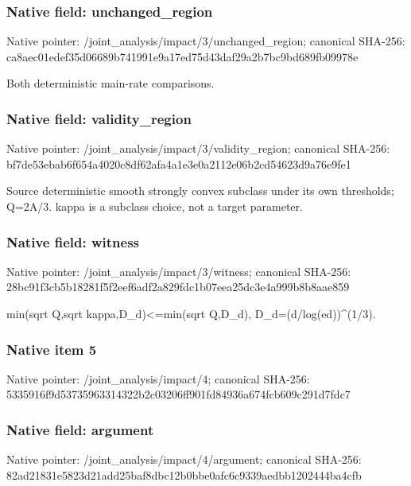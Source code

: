 \documentclass[10pt,a4paper]{article}
\begin{document}
\subsubsection{Native field: unchanged\_\allowbreak{}region}
Native pointer: /joint\_\allowbreak{}analysis/impact/3/unchanged\_\allowbreak{}region; canonical SHA-256: ca8aec01edef35d06689b741991e9a17ed75d43daf29a2b7bc9bd689fb09978e

\begingroup\raggedright\sloppy Both deterministic main-rate comparisons.\par\endgroup

\subsubsection{Native field: validity\_\allowbreak{}region}
Native pointer: /joint\_\allowbreak{}analysis/impact/3/validity\_\allowbreak{}region; canonical SHA-256: bf7de53ebab6f654a4020c8df62afa4a1e3e0a2112e06b2cd54623d9a76e9fe1

\begingroup\raggedright\sloppy Source deterministic smooth strongly convex subclass under its own thresholds;\allowbreak{} Q=\allowbreak{}2A/\allowbreak{}3. kappa is a subclass choice,\allowbreak{} not a target parameter.\par\endgroup

\subsubsection{Native field: witness}
Native pointer: /joint\_\allowbreak{}analysis/impact/3/witness; canonical SHA-256: 28bc91f3cb5b18281f5f2eef6adf2a829fdc1b07eea25dc3e4a999b8b8aae859

\begingroup\raggedright\sloppy min(sqrt Q,\allowbreak{}sqrt kappa,\allowbreak{}D\_\allowbreak{}d)<=\allowbreak{}min(sqrt Q,\allowbreak{}D\_\allowbreak{}d),\allowbreak{} D\_\allowbreak{}d=\allowbreak{}(d/\allowbreak{}log(ed))\textasciicircum{}(1/\allowbreak{}3).\par\endgroup

\subsubsection{Native item 5}
Native pointer: /joint\_\allowbreak{}analysis/impact/4; canonical SHA-256: 5335916f9d53735963314322b2c03206ff901fd84936a674fcb609c291d7fdc7

\subsubsection{Native field: argument}
Native pointer: /joint\_\allowbreak{}analysis/impact/4/argument; canonical SHA-256: 82ad21831e5823d21add25baf8dbc12b0bbe0afc6c9339aedbb1202444ba4cfb
\end{document}
